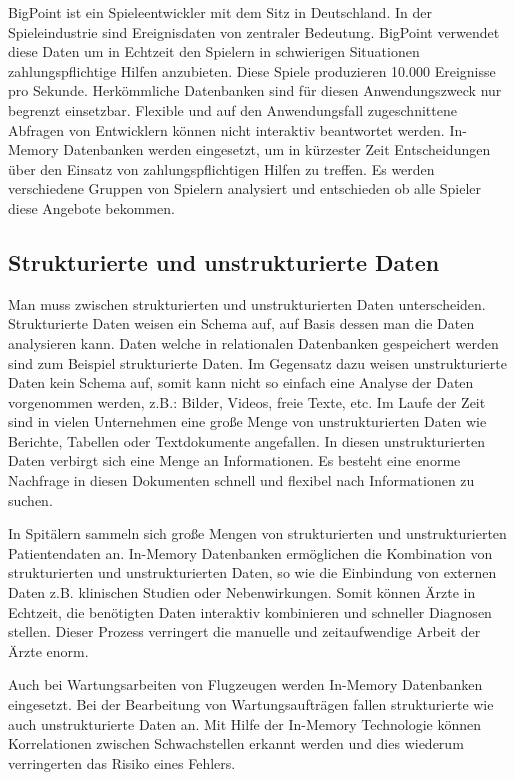 \documentclass[draft,final]{vutinfth} %
\begin{document}
BigPoint ist ein Spieleentwickler mit dem Sitz in Deutschland. In der Spieleindustrie sind Ereignisdaten von zentraler Bedeutung. BigPoint verwendet diese Daten um in Echtzeit den Spielern in schwierigen Situationen zahlungspflichtige Hilfen anzubieten. Diese Spiele produzieren 10.000 Ereignisse pro Sekunde. Herkömmliche Datenbanken sind für diesen Anwendungszweck nur begrenzt einsetzbar. Flexible und auf den Anwendungsfall zugeschnittene Abfragen von Entwicklern können nicht interaktiv beantwortet werden. In-Memory Datenbanken werden eingesetzt, um in kürzester Zeit Entscheidungen über den Einsatz von zahlungspflichtigen Hilfen zu treffen. Es werden verschiedene Gruppen von Spielern analysiert und entschieden ob alle Spieler diese Angebote bekommen.

\subsection*{Strukturierte und unstrukturierte Daten}
Man muss zwischen strukturierten und unstrukturierten Daten unterscheiden. Strukturierte Daten weisen ein Schema auf, auf Basis dessen man die Daten analysieren kann. Daten welche in relationalen Datenbanken gespeichert werden sind zum Beispiel strukturierte Daten. Im Gegensatz dazu weisen unstrukturierte Daten kein Schema auf, somit kann nicht so einfach eine Analyse der Daten vorgenommen werden, z.B.: Bilder, Videos, freie Texte, etc. Im Laufe der Zeit sind in vielen Unternehmen eine gro\ss e Menge von unstrukturierten Daten wie Berichte, Tabellen oder Textdokumente angefallen. In diesen unstrukturierten Daten verbirgt sich eine Menge an Informationen. Es besteht eine enorme Nachfrage in diesen Dokumenten schnell und flexibel nach Informationen zu suchen.

In Spitälern sammeln sich gro\ss e Mengen von strukturierten und unstrukturierten Patientendaten an. In-Memory Datenbanken ermöglichen die Kombination von strukturierten und unstrukturierten Daten, so wie die Einbindung von externen Daten z.B. klinischen Studien oder Nebenwirkungen. Somit können Ärzte in Echtzeit, die benötigten Daten interaktiv kombinieren und schneller Diagnosen stellen. Dieser Prozess verringert die manuelle und zeitaufwendige Arbeit der Ärzte enorm.

Auch bei Wartungsarbeiten von Flugzeugen werden In-Memory Datenbanken eingesetzt. Bei der Bearbeitung von Wartungsaufträgen fallen strukturierte wie auch unstrukturierte Daten an. Mit Hilfe der In-Memory Technologie können Korrelationen zwischen Schwachstellen erkannt werden und dies wiederum verringerten das Risiko eines Fehlers.
\end{document}

